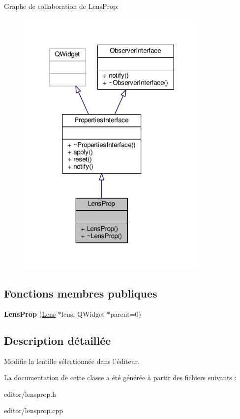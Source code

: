 Graphe de collaboration de Lens\+Prop\+:\nopagebreak
\begin{figure}[H]
\begin{center}
\leavevmode
\includegraphics[width=269pt]{de/d14/classLensProp__coll__graph}
\end{center}
\end{figure}
\subsection*{Fonctions membres publiques}
\begin{DoxyCompactItemize}
\item 
\hypertarget{classLensProp_a2a9f54d768d72f8ad69e1572259d2a85}{{\bfseries Lens\+Prop} (\hyperlink{classLens}{Lens} $\ast$lens, Q\+Widget $\ast$parent=0)}\label{classLensProp_a2a9f54d768d72f8ad69e1572259d2a85}

\end{DoxyCompactItemize}


\subsection{Description détaillée}
Modifie la lentille sélectionnée dans l’éditeur. 

La documentation de cette classe a été générée à partir des fichiers suivants \+:\begin{DoxyCompactItemize}
\item 
editor/lensprop.\+h\item 
editor/lensprop.\+cpp\end{DoxyCompactItemize}
